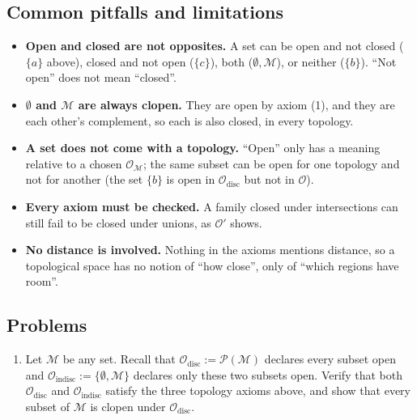 \documentclass[11pt]{article}
\begin{document}
\subsection*{Common pitfalls and limitations}

\begin{itemize}
  \item \textbf{Open and closed are not opposites.} A set can be open and not closed ($\{a\}$ above), closed and not open ($\{c\}$), both ($\emptyset,\mathcal M$), or neither ($\{b\}$). ``Not open'' does not mean ``closed''.
  \item \textbf{$\emptyset$ and $\mathcal M$ are always clopen.} They are open by axiom (1), and they are each other's complement, so each is also closed, in every topology.
  \item \textbf{A set does not come with a topology.} ``Open'' only has a meaning relative to a chosen $\mathcal O_{\mathcal M}$; the same subset can be open for one topology and not for another (the set $\{b\}$ is open in $\mathcal O_{\mathrm{disc}}$ but not in $\mathcal O$).
  \item \textbf{Every axiom must be checked.} A family closed under intersections can still fail to be closed under unions, as $\mathcal O'$ shows.
  \item \textbf{No distance is involved.} Nothing in the axioms mentions distance, so a topological space has no notion of ``how close'', only of ``which regions have room''.
\end{itemize}

\subsection*{Problems}

\begin{enumerate}[label=\textbf{3.\arabic*}, leftmargin=2.2cm]

\item \label{prob:discrete-indiscrete}
Let $\mathcal M$ be any set. Recall that $\mathcal O_{\mathrm{disc}}:=\mathcal P(\mathcal M)$ declares every subset open and $\mathcal O_{\mathrm{indisc}}:=\{\emptyset,\mathcal M\}$ declares only these two subsets open. Verify that both $\mathcal O_{\mathrm{disc}}$ and $\mathcal O_{\mathrm{indisc}}$ satisfy the three topology axioms above, and show that every subset of $\mathcal M$ is clopen under $\mathcal O_{\mathrm{disc}}$.

\end{enumerate}
\end{document}
